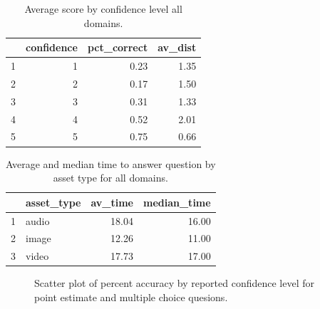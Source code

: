 \documentclass[12pt]{article}
\begin{document}
\begin{table}[ht]
\centering
\begin{tabular}{rrrr}
  \hline
 & confidence & pct\_correct & av\_dist \\ 
  \hline
1 &   1 & 0.23 & 1.35 \\ 
  2 &   2 & 0.17 & 1.50 \\ 
  3 &   3 & 0.31 & 1.33 \\ 
  4 &   4 & 0.52 & 2.01 \\ 
  5 &   5 & 0.75 & 0.66 \\ 
   \hline
\end{tabular}
\caption{Average score by confidence level all domains.} 
\end{table}


\begin{table}[ht]
\centering
\begin{tabular}{rlrr}
  \hline
 & asset\_type & av\_time & median\_time \\ 
  \hline
1 & audio & 18.04 & 16.00 \\ 
  2 & image & 12.26 & 11.00 \\ 
  3 & video & 17.73 & 17.00 \\ 
   \hline
\end{tabular}
\caption{Average and median time to answer question by asset type for all domains.} 
\end{table}


\begin{figure}[ht!]
     \begin{center}
    \end{center}
    \caption{Scatter plot of percent accuracy by reported confidence level for point estimate and multiple choice quesions. }
\end{figure}
\end{document}
